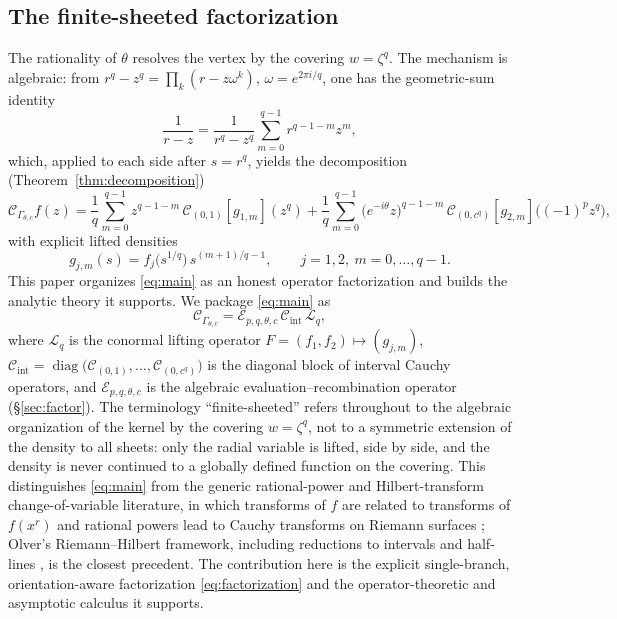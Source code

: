 \documentclass[pdflatex,sn-mathphys-num]{sn-jnl}%
\newcommand{\Cau}{\mathcal{C}}
\newcommand{\Gw}{\Gamma_{\theta,c}}
\newcommand{\Lq}{\mathcal{L}_{q}}
\newcommand{\Cint}{\mathcal{C}_{\mathrm{int}}}
\newcommand{\Eop}{\mathcal{E}_{p,q,\theta,c}}
\theoremstyle{thmstyleone}
\theoremstyle{thmstyletwo}
\theoremstyle{thmstylethree}
\begin{document}
\subsection{The finite-sheeted factorization}
The rationality of $\theta$ resolves the vertex by the covering $w=\zeta^{q}$.
The mechanism is algebraic: from $r^{q}-z^{q}=\prod_{k}(r-z\omega^{k})$,
$\omega=e^{2\pi i/q}$, one has the geometric-sum identity
\begin{equation}\label{eq:geo}
  \frac{1}{r-z}=\frac{1}{r^{q}-z^{q}}\sum_{m=0}^{q-1}r^{q-1-m}z^{m},
\end{equation}
which, applied to each side after $s=r^{q}$, yields the decomposition
(Theorem~\ref{thm:decomposition})
\begin{equation}\label{eq:main}
  \Cau_{\Gw}f(z)
  =\frac1q\sum_{m=0}^{q-1}z^{q-1-m}\,\Cau_{(0,1)}[g_{1,m}](z^{q})
  +\frac1q\sum_{m=0}^{q-1}\bigl(e^{-i\theta}z\bigr)^{q-1-m}\,
     \Cau_{(0,c^{q})}[g_{2,m}]\bigl((-1)^{p}z^{q}\bigr),
\end{equation}
with explicit lifted densities
\begin{equation}\label{eq:gjm}
  g_{j,m}(s)=f_j\!\bigl(s^{1/q}\bigr)\,s^{(m+1)/q-1},
  \qquad j=1,2,\ m=0,\dots,q-1 .
\end{equation}
This paper organizes \eqref{eq:main} as an honest operator factorization and
builds the analytic theory it supports. We package \eqref{eq:main} as
\begin{equation}\label{eq:factorization}
  \Cau_{\Gw}=\Eop\,\Cint\,\Lq,
\end{equation}
where $\Lq$ is the conormal lifting operator $F=(f_1,f_2)\mapsto(g_{j,m})$,
$\Cint=\operatorname{diag}\bigl(\Cau_{(0,1)},\dots,\Cau_{(0,c^{q})}\bigr)$ is the
diagonal block of interval Cauchy operators, and $\Eop$ is the algebraic
evaluation--recombination operator (\S\ref{sec:factor}). The terminology
``finite-sheeted'' refers throughout to the algebraic organization of the kernel
by the covering $w=\zeta^{q}$, not to a symmetric extension of the density to
all sheets: only the radial variable is lifted, side by side, and the density is
never continued to a globally defined function on the covering. This
distinguishes \eqref{eq:main} from the generic rational-power and
Hilbert-transform change-of-variable literature, in which transforms of $f$ are
related to transforms of $f(x^{r})$ and rational powers lead to Cauchy
transforms on Riemann surfaces \cite{king2009hilbert,olver2011computing}; Olver's
Riemann--Hilbert framework, including reductions to intervals and half-lines
\cite{olver2011computing}, is the closest precedent. The contribution here is the
explicit single-branch, orientation-aware factorization \eqref{eq:factorization}
and the operator-theoretic and asymptotic calculus it supports.
\end{document}
